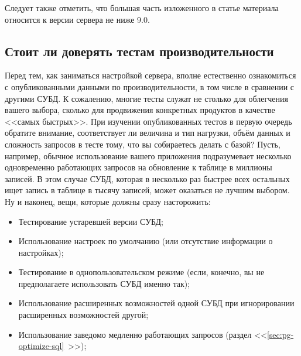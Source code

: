 Следует также отметить, что большая часть изложенного в статье материала относится к версии сервера не ниже 9.0.


\subsection{Стоит ли доверять тестам производительности}

Перед тем, как заниматься настройкой сервера, вполне естественно ознакомиться с опубликованными данными по производительности, в том числе в сравнении с другими СУБД. К сожалению, многие тесты служат не столько для облегчения вашего выбора, сколько для продвижения конкретных продуктов в качестве <<самых быстрых>>. При изучении опубликованных тестов в первую очередь обратите внимание, соответствует ли величина и тип нагрузки, объём данных и сложность запросов в тесте тому, что вы собираетесь делать с базой? Пусть, например, обычное использование вашего приложения подразумевает несколько одновременно работающих запросов на обновление к таблице в миллионы записей. В этом случае СУБД, которая в несколько раз
быстрее всех остальных ищет запись в таблице в тысячу записей, может оказаться не лучшим выбором. Ну и наконец, вещи, которые должны сразу насторожить:

\begin{itemize}
  \item Тестирование устаревшей версии СУБД;
  \item Использование настроек по умолчанию (или отсутствие информации о настройках);
  \item Тестирование в однопользовательском режиме (если, конечно, вы не предполагаете использовать СУБД именно так);
  \item Использование расширенных возможностей одной СУБД при игнорировании расширенных возможностей другой;
  \item Использование заведомо медленно работающих запросов (раздел <<\ref{sec:pg-optimize-sql}~>>);
\end{itemize}

